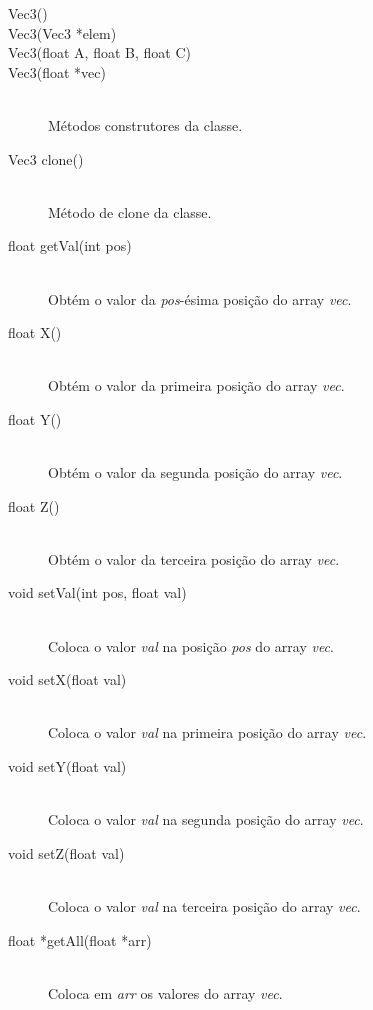 \documentclass[a5paper,onecolumn, 11pt]{article}
\begin{document}
\begin{description}
	\item[Vec3()]
	\item[Vec3(Vec3 *elem)]
	\item[Vec3(float A, float B, float C)]
	\item[Vec3(float *vec)] \hfill \\
	Métodos construtores da classe.
	
	\item[Vec3 clone()] \hfill \\
	Método de clone da classe.
	
	\item[float getVal(int pos)] \hfill \\
	Obtém o valor da \textit{pos}-ésima posição do array \textit{vec}.
	
	\item[float X()] \hfill \\
	Obtém o valor da primeira posição do array \textit{vec}.

	\item[float Y()] \hfill \\
	Obtém o valor da segunda posição do array \textit{vec}.
	
	\item[float Z()] \hfill \\
	Obtém o valor da terceira posição do array \textit{vec}.
	
	\item[void setVal(int pos, float val)] \hfill \\
	Coloca o valor \textit{val} na posição \textit{pos} do array \textit{vec}.
	
	\item[void setX(float val)] \hfill \\
	Coloca o valor \textit{val} na primeira posição do array \textit{vec}.
	
	\item[void setY(float val)] \hfill \\
	Coloca o valor \textit{val} na segunda posição do array \textit{vec}.
	
	\item[void setZ(float val)] \hfill \\
	Coloca o valor \textit{val} na terceira posição do array \textit{vec}.
	
	\item[float *getAll(float *arr)] \hfill \\
	Coloca em \textit{arr} os valores do array \textit{vec}.
	

\end{description}
\end{document}
